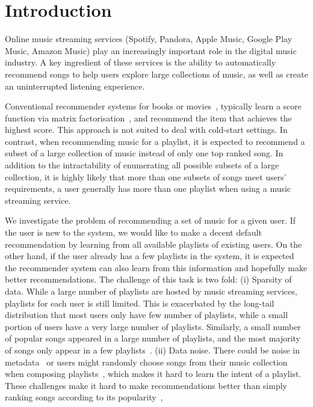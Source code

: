 \section{Introduction}
\label{sec:intro}
Online music streaming services (\eg Spotify, Pandora, Apple Music, Google Play Music, Amazon Music) 
play an increasingly important role in the digital music industry.
A key ingredient of these services is the ability to automatically recommend songs to help users explore large collections of music,
as well as create an uninterrupted listening experience.

Conventional recommender systems for books or movies~\citep{Sarwar:2001,Netflix},
typically learn a score function via matrix factorisation~\citep{Koren:2009},
and recommend the item that achieves the highest score.
This approach is not suited to deal with cold-start settings.
%
In contrast, when recommending music for a playlist, 
it is expected to recommend a subset of a large collection of music instead of only one top ranked song.
In addition to the intractability of enumerating all possible subsets of a large collection,
it is highly likely that more than one subsets of songs meet users' requirements,
\eg a user generally has more than one playlist when using a music streaming service.

We investigate the problem of recommending a set of music for a given user.
If the user is new to the system, we would like to make a decent default recommendation by learning from 
all available playlists of existing users.
On the other hand, if the user already has a few playlists in the system, it is expected the recommender 
system can also learn from this information and hopefully make better recommendations.
%
The challenge of this task is two fold:
(i) Sparsity of data. While a large number of playlists are hosted by music streaming services,
playlists for each user is still limited. This is exacerbated by the long-tail distribution that
most users only have few number of playlists, while a small portion of users have a very large number of playlists.
Similarly, a small number of popular songs appeared in a large number of playlists, and the most majority of songs
only appear in a few playlists~\cite{bonnin2013evaluating}.
(ii) Data noise. There could be noise in metadata~\cite{bonnin2015automated} or users might randomly choose songs 
from their music collection when composing playlists~\cite{mcfee2012hypergraph},
which makes it hard to learn the intent of a playlist.
These challenges make it hard to make recommendations better than simply ranking songs according to its 
popularity~\cite{mcfee2012million,bonnin2013evaluating,bonnin2015automated},


